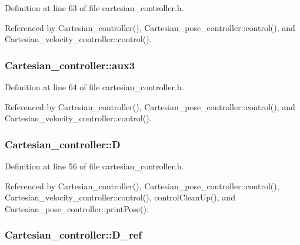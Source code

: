 Definition at line 63 of file cartesian\-\_\-controller.\-h.



Referenced by Cartesian\-\_\-controller(), Cartesian\-\_\-pose\-\_\-controller\-::control(), and Cartesian\-\_\-velocity\-\_\-controller\-::control().

\hypertarget{classCartesian__controller_aa37c15fcd53a60ecce106cd9b39d3501}{
\subsubsection[{aux3}]{ Cartesian\-\_\-controller\-::aux3\hspace{0.3cm}{\ttfamily [protected]}}}\label{classCartesian__controller_aa37c15fcd53a60ecce106cd9b39d3501}


Definition at line 64 of file cartesian\-\_\-controller.\-h.



Referenced by Cartesian\-\_\-controller(), Cartesian\-\_\-pose\-\_\-controller\-::control(), and Cartesian\-\_\-velocity\-\_\-controller\-::control().

\hypertarget{classCartesian__controller_a8c470b652ce436d8e48f126073fc2593}{
\subsubsection[{D}]{ Cartesian\-\_\-controller\-::\-D\hspace{0.3cm}{\ttfamily [protected]}}}\label{classCartesian__controller_a8c470b652ce436d8e48f126073fc2593}


Definition at line 56 of file cartesian\-\_\-controller.\-h.



Referenced by Cartesian\-\_\-controller(), Cartesian\-\_\-pose\-\_\-controller\-::control(), Cartesian\-\_\-velocity\-\_\-controller\-::control(), control\-Clean\-Up(), and Cartesian\-\_\-pose\-\_\-controller\-::print\-Pose().

\hypertarget{classCartesian__controller_abb248cb3215a574fe8e1bb8fb0b8626d}{
\subsubsection[{D\-\_\-ref}]{ Cartesian\-\_\-controller\-::\-D\-\_\-ref\hspace{0.3cm}{\ttfamily [protected]}}}\label{classCartesian__controller_abb248cb3215a574fe8e1bb8fb0b8626d}


